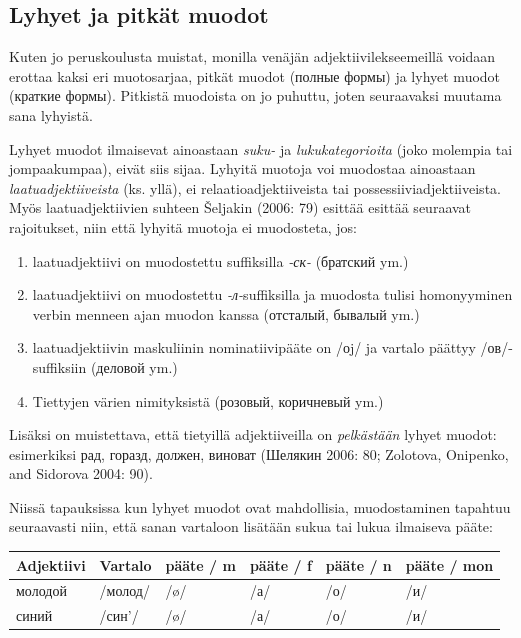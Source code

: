 \documentclass[]{scrreprt}
\providecommand{\tightlist}{%
  \setlength{\itemsep}{0pt}\setlength{\parskip}{0pt}}
\begin{document}
\subsection{Lyhyet ja pitkät
muodot}\label{lyhyet-ja-pitkuxe4t-muodot}

Kuten jo peruskoulusta muistat, monilla venäjän adjektiivilekseemeillä
voidaan erottaa kaksi eri muotosarjaa, pitkät muodot (полные формы) ja
lyhyet muodot (краткие формы). Pitkistä muodoista on jo puhuttu, joten
seuraavaksi muutama sana lyhyistä.

Lyhyet muodot ilmaisevat ainoastaan \emph{suku-} ja
\emph{lukukategorioita} (joko molempia tai jompaakumpaa), eivät siis
sijaa. Lyhyitä muotoja voi muodostaa ainoastaan
\emph{laatuadjektiiveista} (ks. yllä), ei relaatioadjektiiveista tai
possessiiviadjektiiveista. Myös laatuadjektiivien suhteen Šeljakin
(2006: 79) esittää esittää seuraavat rajoitukset, niin että lyhyitä
muotoja ei muodosteta, jos:

\begin{enumerate}
\def\labelenumi{\arabic{enumi}.}
\tightlist
\item
  laatuadjektiivi on muodostettu suffiksilla \emph{-ск-} (братский ym.)
\item
  laatuadjektiivi on muodostettu \emph{-л-}suffiksilla ja muodosta
  tulisi homonyyminen verbin menneen ajan muodon kanssa (отсталый,
  бывалый ym.)
\item
  laatuadjektiivin maskuliinin nominatiivipääte on /оj/ ja vartalo
  päättyy /ов/-suffiksiin (деловой ym.)
\item
  Tiettyjen värien nimityksistä (розовый, коричневый ym.)
\end{enumerate}

Lisäksi on muistettava, että tietyillä adjektiiveilla on
\emph{pelkästään} lyhyet muodot: esimerkiksi рад, горазд, должен,
виноват (Шелякин 2006: 80; Zolotova, Onipenko, and Sidorova 2004: 90).

Niissä tapauksissa kun lyhyet muodot ovat mahdollisia, muodostaminen
tapahtuu seuraavasti niin, että sanan vartaloon lisätään sukua tai lukua
ilmaiseva pääte:

\begin{longtable}[c]{@{}llllll@{}}
\toprule
Adjektiivi & Vartalo & pääte / m & pääte / f & pääte / n & pääte /
mon\tabularnewline
\midrule
\endhead
молодой & /молод/ & /ø/ & /а/ & /о/ & /и/\tabularnewline
синий & /син'/ & /ø/ & /а/ & /о/ & /и/\tabularnewline
\bottomrule
\end{longtable}
\end{document}
